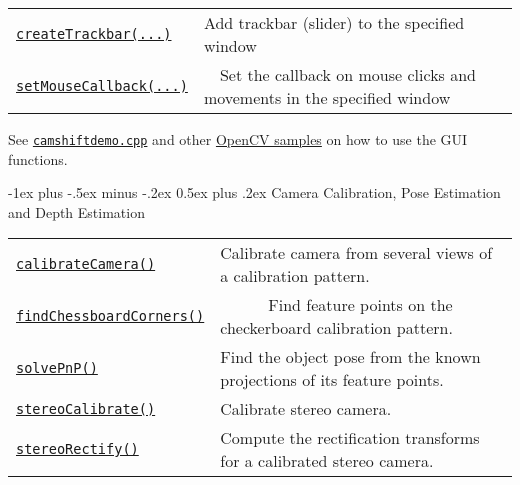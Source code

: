 \documentclass[10pt,landscape]{article}
\makeatletter
\renewcommand{\section}{\@startsection{section}{1}{0mm}%
                                {-1ex plus -.5ex minus -.2ex}%
                                {0.5ex plus .2ex}%
                                {\normalfont\large\bfseries}}
\makeatother
\begin{document}
\begin{multicols}{3}
\begin{tabular}{@{}p{\the\MyLen}%
                @{}p{\linewidth-\the\MyLen}@{}}
\texttt{\href{http://opencv.willowgarage.com/documentation/cpp/highgui_user_interface.html\#cv-createTrackbar}{createTrackbar(...)}} & Add trackbar (slider) to the specified window \\

\texttt{\href{http://opencv.willowgarage.com/documentation/cpp/highgui_user_interface.html\#cv-setmousecallback}{setMouseCallback(...)}} & \ \ Set the callback on mouse clicks and movements in the specified window \\

\end{tabular}

See \texttt{\href{https://code.ros.org/svn/opencv/trunk/opencv/samples/cpp/camshiftdemo.cpp}{camshiftdemo.cpp}} and other \href{https://code.ros.org/svn/opencv/trunk/opencv/samples/}{OpenCV samples} on how to use the GUI functions.   

\section{Camera Calibration, Pose Estimation and Depth Estimation}

\begin{tabular}{@{}p{\the\MyLen}%
                @{}p{\linewidth-\the\MyLen}@{}}

\texttt{\href{http://opencv.willowgarage.com/documentation/cpp/calib3d_camera_calibration_and_3d_reconstruction.html\#cv-calibratecamera}{calibrateCamera()}} & Calibrate camera from several views of a calibration pattern. \\

\texttt{\href{http://opencv.willowgarage.com/documentation/cpp/calib3d_camera_calibration_and_3d_reconstruction.html\#cv-findchessboardcorners}{findChessboardCorners()}} & \ \ \ \ \ \ Find feature points on the checkerboard calibration pattern. \\

\texttt{\href{http://opencv.willowgarage.com/documentation/cpp/calib3d_camera_calibration_and_3d_reconstruction.html\#cv-solvepnp}{solvePnP()}} & Find the object pose from the known projections of its feature points. \\

\texttt{\href{http://opencv.willowgarage.com/documentation/cpp/calib3d_camera_calibration_and_3d_reconstruction.html\#cv-stereocalibrate}{stereoCalibrate()}} & Calibrate stereo camera. \\

\texttt{\href{http://opencv.willowgarage.com/documentation/cpp/calib3d_camera_calibration_and_3d_reconstruction.html\#cv-stereorectify}{stereoRectify()}} & Compute the rectification transforms for a calibrated stereo camera.\\


\end{tabular}
\end{multicols}
\end{document}
